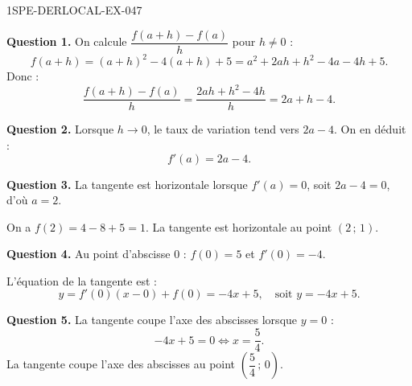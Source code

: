 \begin{corrige}{1SPE-DERLOCAL-EX-047}

\textbf{Question 1.} On calcule $\dfrac{f(a+h) - f(a)}{h}$ pour $h
\neq 0$ :
\[
f(a+h) = (a+h)^2 - 4(a+h) + 5 = a^2 + 2ah + h^2 - 4a - 4h + 5.
\]
Donc :
\[
\frac{f(a+h) - f(a)}{h} = \frac{2ah + h^2 - 4h}{h} = \boxed{2a + h - 4}.
\]

\textbf{Question 2.} Lorsque $h \to 0$, le taux de variation tend vers $2a - 4$. On en déduit :
\[
\boxed{f'(a) = 2a - 4}.
\]

\textbf{Question 3.} La tangente est horizontale lorsque $f'(a) = 0$, soit $2a - 4 = 0$, d'où $a = 2$.

On a $f(2) = 4 - 8 + 5 = 1$. La tangente est horizontale au point $\boxed{(2\,;\,1)}$.

\textbf{Question 4.} Au point d'abscisse $0$ : $f(0) = 5$ et $f'(0) = -4$.

L'équation de la tangente est :
\[
y = f'(0)(x - 0) + f(0) = -4x + 5, \quad \text{soit } \boxed{y = -4x + 5}.
\]

\textbf{Question 5.} La tangente coupe l'axe des abscisses lorsque $y = 0$ :
\[
-4x + 5 = 0 \iff x = \frac{5}{4}.
\]
La tangente coupe l'axe des abscisses au point $\boxed{\left(\dfrac{5}{4}\,;\,0\right)}$.

\end{corrige}

